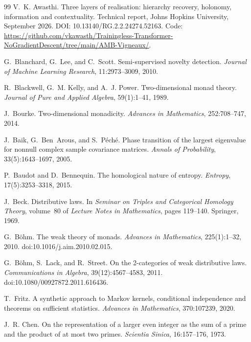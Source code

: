 \documentclass[11pt]{article}
\theoremstyle{definition}
\theoremstyle{remark}
\begin{document}
\begin{thebibliography}{99}
V.~K. Awasthi.
\newblock Three layers of realisation: hierarchy recovery, holonomy, information and contextuality.
\newblock Technical report, Johns Hopkins University, September 2026.
\newblock DOI: 10.13140/RG.2.2.24274.52163. Code: \url{https://github.com/vkawasth/Trainingless-Transformer-NoGradientDescent/tree/main/AMB-Vigneaux/}.

G.~Blanchard, G.~Lee, and C.~Scott.
\newblock Semi-supervised novelty detection.
\newblock \emph{Journal of Machine Learning Research}, 11:2973--3009, 2010.

R.~Blackwell, G.~M. Kelly, and A.~J. Power.
\newblock Two-dimensional monad theory.
\newblock \emph{Journal of Pure and Applied Algebra}, 59(1):1--41, 1989.

J.~Bourke.
\newblock Two-dimensional monadicity.
\newblock \emph{Advances in Mathematics}, 252:708--747, 2014.

J.~Baik, G.~Ben~Arous, and S.~P\'ech\'e.
\newblock Phase transition of the largest eigenvalue for nonnull complex sample covariance matrices.
\newblock \emph{Annals of Probability}, 33(5):1643--1697, 2005.

P.~Baudot and D.~Bennequin.
\newblock The homological nature of entropy.
\newblock \emph{Entropy}, 17(5):3253--3318, 2015.

J.~Beck.
\newblock Distributive laws.
\newblock In \emph{Seminar on Triples and Categorical Homology Theory}, volume~80 of \emph{Lecture
  Notes in Mathematics}, pages 119--140. Springer, 1969.

G.~B\"ohm.
\newblock The weak theory of monads.
\newblock \emph{Advances in Mathematics}, 225(1):1--32, 2010.
\newblock doi:10.1016/j.aim.2010.02.015.

G.~B\"ohm, S.~Lack, and R.~Street.
\newblock On the 2-categories of weak distributive laws.
\newblock \emph{Communications in Algebra}, 39(12):4567--4583, 2011.
\newblock doi:10.1080/00927872.2011.616436.

T.~Fritz.
\newblock A synthetic approach to {M}arkov kernels, conditional independence and theorems on
  sufficient statistics.
\newblock \emph{Advances in Mathematics}, 370:107239, 2020.

J.~R. Chen.
\newblock On the representation of a larger even integer as the sum of a prime and the product of at
  most two primes.
\newblock \emph{Scientia Sinica}, 16:157--176, 1973.


\end{thebibliography}
\end{document}
